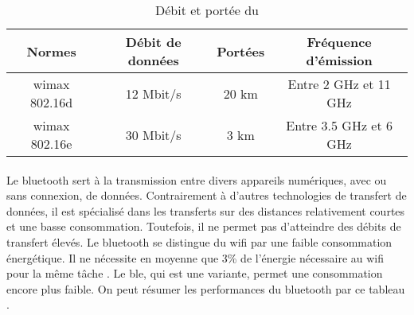 \begin{table}[H]
    \centering
    \begin{tabular}{|c|c|c|c|}
        \hline
        \rowcolor{tableColorDark} Normes & Débit de données & Portées & Fréquence d'émission   \\
        \hline

        \gls{wimax} 802.16d              & 12 Mbit/s        & 20 km   & Entre 2 GHz et 11 GHz  \\\hline
        \gls{wimax} 802.16e              & 30 Mbit/s        & 3 km    & Entre 3.5 GHz et 6 GHz \\\hline
    \end{tabular}
    \label{tab:debitPorteeWimax}
    \caption{Débit et portée du }
    \nocite{debitPortee}
\end{table}


\paragraph{}
\label{sec:bluetooth}

Le \gls{bluetooth} sert à la transmission entre divers appareils numériques, avec ou sans connexion,
de données. Contrairement à d'autres technologies de transfert de données, il est
spécialisé dans les transferts sur des distances relativement courtes et une basse
consommation. Toutefois, il ne permet pas d'atteindre des débits de transfert élevés.\newline
Le \gls{bluetooth} se distingue du \gls{wifi} par une faible consommation énergétique. Il
ne nécessite en moyenne que 3\% de l'énergie nécessaire au \gls{wifi} pour la même tâche \cite{bluetoothConsumption}.
Le \gls{ble}, qui est une variante, permet une consommation encore plus faible.\newline
On peut résumer les performances du \gls{bluetooth} par ce tableau \cite{debitPortee, ble}.

